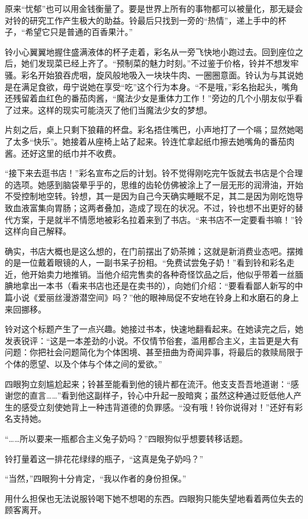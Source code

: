 原来“忧郁”也可以用金钱衡量了。要是世界上所有的事物都可以被量化，那无疑会对铃的研究工作产生极大的助益。铃最后只找到一旁的“热情”，递上手中的杯子，“希望它只是普通的百香果汁。”

铃小心翼翼地握住盛满液体的杯子走着，彩名从一旁飞快地小跑过去。回到座位之后，她们发现菜已经上齐了。“预制菜的魅力时刻。”不过鉴于价格，铃并不想发牢骚。彩名开始狼吞虎咽，旋风般地吸入一块块牛肉、一圈圈意面。铃认为与其说她是在满足食欲，毋宁说她在享受“吃”这个行为本身。“不是哦，”彩名抬起头，嘴角还残留着血红色的番茄肉酱，“魔法少女是重体力工作！”旁边的几个小朋友似乎看了过来。这样的现实可能浇灭了他们当魔法少女的梦想。

片刻之后，桌上只剩下狼藉的杯盘。彩名捂住嘴巴，小声地打了一个嗝；显然她喝了太多“快乐”。她接着从座椅上站了起来。铃连忙拿起纸巾擦去她嘴角的番茄肉酱。还好这里的纸巾并不收费。

“接下来去逛书店！”彩名宣布之后的计划。铃不觉得刚吃完午饭就去书店是个合理的选项。她感到脑袋晕乎乎的，思维的齿轮仿佛被涂上了一层无形的润滑油，开始不受控制地空转。铃想，其一是因为自己今天确实睡眠不足，其二是因为刚吃饱导致血液富集向胃肠；这两者叠加，造成了现在的状况。不过，铃也想不出更好的替代方案，于是就半不情愿地被彩名拉着来到了书店。“来书店不一定要看书嘛！”铃这样向自己解释。

确实，书店大概也是这么想的，在门前摆出了奶茶摊；这就是新消费业态吧。摆摊的是一位戴着眼镜的人，一副书呆子扮相。“免费试尝兔子奶！”看到铃和彩名走近，他开始卖力地推销。当他介绍完售卖的各种奇怪饮品之后，他似乎带着一丝腼腆地拿出一本书（看来书店也还是在卖书的），向她们介绍：“要看看鄙人新写的中篇小说《爱丽丝漫游潜空间》吗？”他的眼神局促不安地在铃身上和水磨石的身上来回挪移。

铃对这个标题产生了一点兴趣。她接过书本，快速地翻看起来。在她读完之后，她发表锐评：“这是一本差劲的小说。不仅情节俗套，滥用都合主义，主旨更是大有问题：你把社会问题简化为个体困境、甚至扭曲为奇闻异事，将最后的救赎局限于个体的愿望、以及个体与个体之间的爱欲。”

四眼狗立刻尴尬起来；铃甚至能看到他的镜片都在流汗。他支支吾吾地道谢：“感谢您的直言……”看到他这副样子，铃心中升起一股暗爽；虽然这种通过贬低他人产生的感受立刻使她背上一种违背道德的负罪感。“没有哦！铃你说得对！”还好有彩名支持她。

“……所以要来一瓶都合主义兔子奶吗？”四眼狗似乎想要转移话题。

铃打量着这一排花花绿绿的瓶子，“这真是兔子奶吗？”

“当然，”四眼狗十分肯定，“我以作者的身份担保。”

\begin{branch}
\gutend 用什么担保也无法说服铃喝下她不想喝的东西。四眼狗只能失望地看着两位失去的顾客离开。
\end{branch}


